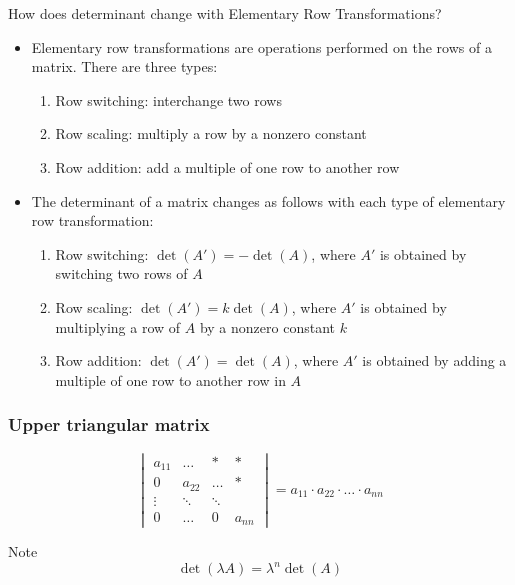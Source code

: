 \documentclass[fullscreen=true, bookmarks=true, hyperref={pdfencoding=unicode}]{beamer}
\begin{document}
\begin{frame}{How does determinant change with Elementary Row Transformations?}
  \begin{itemize}
    \pause
    \item Elementary row transformations are operations performed on the rows of a matrix. There are three types:
      \begin{enumerate}
        \item Row switching: interchange two rows
        \item Row scaling: multiply a row by a nonzero constant
        \item Row addition: add a multiple of one row to another row
      \end{enumerate}
      \pause
      \item The determinant of a matrix changes as follows with each type of elementary row transformation:
      \begin{enumerate}
        \item Row switching: $\det(A') = -\det(A)$, where $A'$ is obtained by switching two rows of $A$
        \item Row scaling: $\det(A') = k\det(A)$, where $A'$ is obtained by multiplying a row of $A$ by a nonzero constant $k$
        \item Row addition: $\det(A') = \det(A)$, where $A'$ is obtained by adding a multiple of one row to another row in $A$
      \end{enumerate}
  \end{itemize}
\end{frame}


\begin{frame}
  \frametitle{Upper triangular matrix}
  $$\begin{vmatrix}
    a_{11} & \dots & * &  * \\
    0 & a_{22} & \dots &  * \\
    \vdots & \ddots & \ddots & \\
    0 & \dots & 0 & a_{nn}
  \end{vmatrix} = a_{11}\cdot a_{22}\cdot \hdots \cdot a_{nn}
  $$

  \vspace{1cm}
  \pause
  \begin{block}{Note}
    \[
      \det(\lambda A) = \lambda^n \det(A)
    \]      
  \end{block}
\end{frame}
\end{document}

